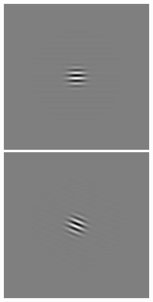 \begin{figure}[ht]
\begin{center}
 \includegraphics[width=\columnwidth/9]{ch4/figures/iGabor2_4.jpg}
 \includegraphics[width=\columnwidth/9]{ch4/figures/iGabor2_5.jpg}

\end{center}
\end{figure}
